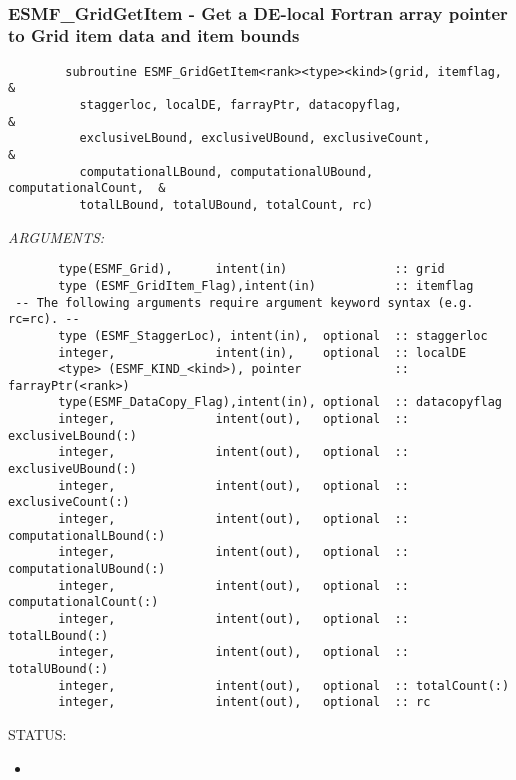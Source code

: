  
\mbox{}\hrulefill\ 
 

  \label{API:GridGetItem}\subsubsection [ESMF\_GridGetItem] {ESMF\_GridGetItem - Get a DE-local Fortran array pointer to Grid item data and item bounds}


\begin{verbatim}        subroutine ESMF_GridGetItem<rank><type><kind>(grid, itemflag,  &
          staggerloc, localDE, farrayPtr, datacopyflag,                  &
          exclusiveLBound, exclusiveUBound, exclusiveCount,              &
          computationalLBound, computationalUBound, computationalCount,  &
          totalLBound, totalUBound, totalCount, rc)\end{verbatim}{\em ARGUMENTS:}
\begin{verbatim}       type(ESMF_Grid),      intent(in)               :: grid
       type (ESMF_GridItem_Flag),intent(in)           :: itemflag
 -- The following arguments require argument keyword syntax (e.g. rc=rc). --
       type (ESMF_StaggerLoc), intent(in),  optional  :: staggerloc
       integer,              intent(in),    optional  :: localDE
       <type> (ESMF_KIND_<kind>), pointer             :: farrayPtr(<rank>)
       type(ESMF_DataCopy_Flag),intent(in), optional  :: datacopyflag
       integer,              intent(out),   optional  :: exclusiveLBound(:)
       integer,              intent(out),   optional  :: exclusiveUBound(:)
       integer,              intent(out),   optional  :: exclusiveCount(:)
       integer,              intent(out),   optional  :: computationalLBound(:)
       integer,              intent(out),   optional  :: computationalUBound(:)
       integer,              intent(out),   optional  :: computationalCount(:)
       integer,              intent(out),   optional  :: totalLBound(:)
       integer,              intent(out),   optional  :: totalUBound(:)
       integer,              intent(out),   optional  :: totalCount(:)
       integer,              intent(out),   optional  :: rc\end{verbatim}
{\sf STATUS:}
   \begin{itemize}
   \item{}
   \end{itemize}
  

